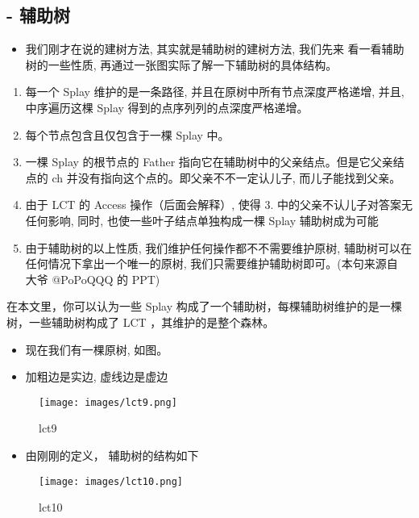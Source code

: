 \subsection{- 辅助树}

\begin{itemize}
\item 我们刚才在说的建树方法, 其实就是辅助树的建树方法, 我们先来 看⼀看辅助树的一些性质, 再通过一张图实际了解一下辅助树的具体结构。
\end{itemize}

\begin{enumerate}
\item 每⼀个 Splay 维护的是一条路径, 并且在原树中所有节点深度严格递增, 并且, 中序遍历这棵 Splay 得到的点序列列的点深度严格递增。
\item 每个节点包含且仅包含于一棵 Splay 中。
\item ⼀棵 Splay 的根节点的 Father 指向它在辅助树中的父亲结点。但是它父亲结点的 ch 并没有指向这个点的。即父亲不不⼀定认⼉子, ⽽⼉子能找到⽗亲。
\item 由于 LCT 的 Access 操作（后面会解释）, 使得 3. 中的⽗亲不认⼉子对答案⽆任何影响, 同时, 也使一些叶⼦结点单独构成一棵 Splay 辅助树成为可能
\item 由于辅助树的以上性质, 我们维护任何操作都不不需要维护原树, 辅助树可以在任何情况下拿出一个唯一的原树, 我们只需要维护辅助树即可。(本句来源自 大爷 @PoPoQQQ 的 PPT)
\end{enumerate}

在本文里，你可以认为一些 Splay 构成了一个辅助树，每棵辅助树维护的是一棵树，一些辅助树构成了 LCT ，其维护的是整个森林。

\begin{itemize}
\item 现在我们有⼀棵原树, 如图。 
\item 加粗边是实边, 虚线边是虚边
\end{itemize}

\begin{figure}[h]
\centering
\texttt{[image: images/lct9.png]} 
\caption{lct9}
\end{figure}

\begin{itemize}
\item 由刚刚的定义， 辅助树的结构如下
\end{itemize}

\begin{figure}[h]
\centering
\texttt{[image: images/lct10.png]} 
\caption{lct10}
\end{figure}

